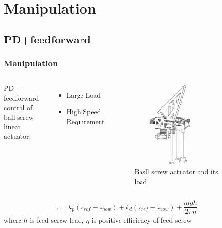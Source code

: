 \documentclass{beamer}
\begin{document}
\section{Manipulation}
\subsection{PD+feedforward}
\begin{frame}
  \frametitle{Manipulation}
  \vspace{-2.0cm}
  \begin{columns}
    PD + feedforward control of ball screw linear actuator:
    \begin{itemize}
      \item Large Load
      \item High Speed Requirement
    \end{itemize}

    \begin{figure}
      \includegraphics[width = 0.8\textwidth]{fig/screw.jpg}
      \caption{Basll screw actuator and its load}
    \end{figure}
  \end{columns}
  \begin{equation}
    \tau = k_p(z_{ref}-z_{now})+k_d(\dot{z}_{ref}-\dot{z}_{now})+ \frac{mgh}{2\pi \eta}
  \end{equation}
  where $h$ is feed screw lead, $\eta$ is positive efficiency of feed screw
\end{frame}
\end{document}
